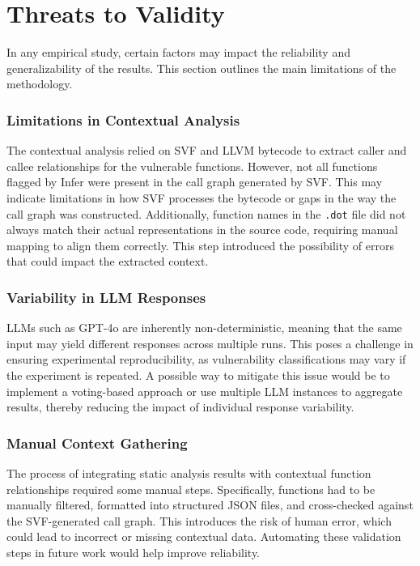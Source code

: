 \section{Threats to Validity}
\label{sec:threats}

In any empirical study, certain factors may impact the reliability and generalizability of the results. This section outlines the main limitations of the methodology.

\subsubsection{Limitations in Contextual Analysis}
The contextual analysis relied on SVF and LLVM bytecode to extract caller and callee relationships for the vulnerable functions. However, not all functions flagged by Infer were present in the call graph generated by SVF. This may indicate limitations in how SVF processes the bytecode or gaps in the way the call graph was constructed. Additionally, function names in the \texttt{.dot} file did not always match their actual representations in the source code, requiring manual mapping to align them correctly. This step introduced the possibility of errors that could impact the extracted context.

\subsubsection{Variability in LLM Responses}
LLMs such as GPT-4o are inherently non-deterministic, meaning that the same input may yield different responses across multiple runs. This poses a challenge in ensuring experimental reproducibility, as vulnerability classifications may vary if the experiment is repeated. A possible way to mitigate this issue would be to implement a voting-based approach or use multiple LLM instances to aggregate results, thereby reducing the impact of individual response variability.

\subsubsection{Manual Context Gathering}
The process of integrating static analysis results with contextual function relationships required some manual steps. Specifically, functions had to be manually filtered, formatted into structured JSON files, and cross-checked against the SVF-generated call graph. This introduces the risk of human error, which could lead to incorrect or missing contextual data. Automating these validation steps in future work would help improve reliability.
